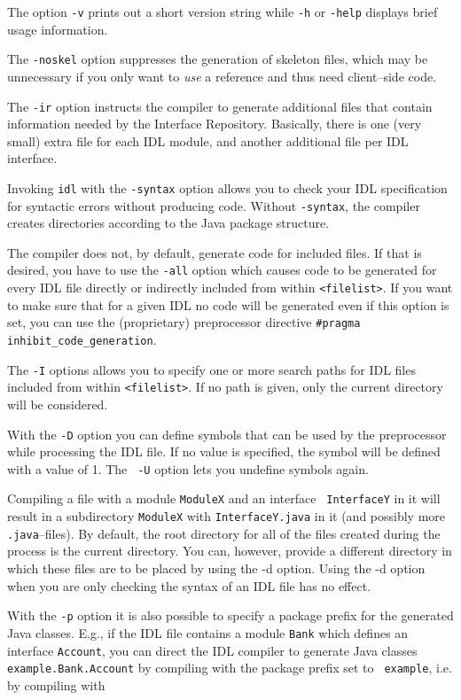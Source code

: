 \documentclass[12pt]{scrbook}
\begin{document}
The option {\tt  -v} prints out a short version  string while {\tt -h}
or {\tt -help} displays brief usage information.

The {\tt -noskel} option suppresses the generation of skeleton files,
which may be unnecessary if you only want to {\em use} a reference and
thus need client--side code.

The  {\tt -ir} option  instructs the  compiler to  generate additional
files   that    contain   information   needed    by   the   Interface
Repository. Basically, there  is one (very small) extra  file for each
IDL module, and another additional file per IDL interface.

Invoking {\tt idl}  with the {\tt -syntax} option  allows you to check
your IDL  specification for  syntactic errors without  producing code.
Without {\tt  -syntax}, the compiler creates  directories according to
the Java package structure. 

The  compiler  does  not,  by  default,  generate  code  for  included
files. If that is desired, you have to use the {\tt -all} option which
causes code to be generated  for every IDL file directly or indirectly
included from within  {\tt <filelist>}. If you want  to make sure that
for a given IDL no code will  be generated even if this option is set,
you  can use  the  (proprietary) preprocessor  directive {\tt \#pragma
inhibit\_code\_generation}.

The {\tt-I} options allows you to specify one or more search paths for
IDL files included from within  {\tt <filelist>}. If no path is given,
only the  current directory will  be considered. 

With the  {\tt -D} option you can  define symbols that can  be used by
the  preprocessor while  processing  the  IDL file.   If  no value  is
specified, the  symbol will be  defined with a  value of 1. The {\tt
  -U} option lets you undefine symbols again.

Compiling a  file with  a module {\tt  ModuleX} and an  interface {\tt
  InterfaceY} in it  will result in a subdirectory  {\tt ModuleX} with
  {\tt    InterfaceY.java}   in   it    (and   possibly    more   {\tt
  .java}--files). By default, the root  directory for all of the files
  created  during  the process  is  the  current  directory. You  can,
  however, provide a  different directory in which these  files are to
  be placed by  using the -d option. Using the -d  option when you are
  only checking the syntax of an IDL file has no effect.

With the  {\tt -p}  option it  is also possible  to specify  a package
prefix for the generated Java  classes. E.g., if the IDL file contains
a module {\tt Bank} which  defines an interface {\tt Account}, you can
direct   the   IDL   compiler    to   generate   Java   classes   {\tt
example.Bank.Account} by compiling with the package prefix set to {\tt
example}, i.e. by compiling with
\end{document}

